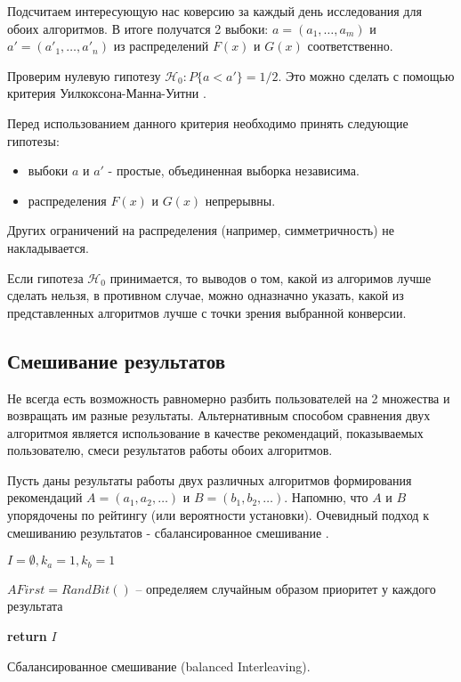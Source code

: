 \documentclass[12pt,a4paper]{report}
\begin{document}
Подсчитаем интересующую нас коверсию за каждый день исследования для обоих алгоритмов. В итоге получатся 2 выбоки: $a = (a_1, \dots, a_m)$ и $a' = (a'_1, \dots, a'_n)$ из распределений $F(x)$ и $G(x)$ соответственно.

Проверим нулевую гипотезу $\mathcal{H}_0: \textit{P}\{a < a'\} = 1/2$. Это можно сделать с помощью критерия Уилкоксона-Манна-Уитни \cite{Mw}.

Перед использованием данного критерия необходимо принять следующие гипотезы:
\begin{itemize}
\item выбоки $a$ и $a'$ - простые, объединенная выборка независима.
\item распределения $F(x)$ и $G(x)$ непрерывны.
\end{itemize}
Других ограничений на распределения (например, симметричность) не накладывается.

Если гипотеза $\mathcal{H}_0$ принимается, то выводов о том, какой из алгоримов лучше сделать нельзя, в противном случае, можно одназначно указать, какой из представленных алгоритмов лучше с точки зрения выбранной конверсии.

\subsection{Смешивание результатов}

Не всегда есть возможность равномерно разбить пользователей на 2 множества и возвращать им разные результаты. Альтернативным способом сравнения двух алгоритмоя является использование в качестве рекомендаций, показываемых пользователю, смеси результатов работы обоих алгоритмов.

Пусть даны результаты работы двух различных алгоритмов формирования рекомендаций $A = (a_1, a_2, \dots)$ и $B = (b_1, b_2, \dots)$. Напомню, что $A$ и $B$ упорядочены по рейтингу (или вероятности установки). Очевидный подход к смешиванию результатов - сбалансированное смешивание \cite{In}.

\begin{algorithm}[H]
\SetAlgoLined
{}
$I = \emptyset, k_a = 1, k_b = 1$

$AFirst = RandBit()$ -- определяем случайным образом приоритет у каждого результата

\textbf{return} $I$
\caption{Сбалансированное смешивание (balanced Interleaving).}
\label{alg:BI}
\end{algorithm}
\end{document}
